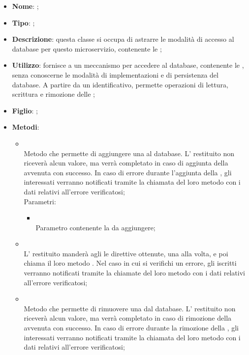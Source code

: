 \begin{itemize}
	\item \textbf{Nome}: ;
	\item \textbf{Tipo}: ;
	\item \textbf{Descrizione}: questa classe si occupa di astrarre le modalità di accesso al database per questo microservizio, contenente le ;
	\item \textbf{Utilizzo}: fornisce a  un meccanismo per accedere al database, contenente le , senza conoscerne le modalità di implementazioni e di persistenza del database. A partire da un identificativo, permette operazioni di lettura, scrittura e rimozione delle ;
	\item \textbf{Figlio}: ;
	\item \textbf{Metodi}:
	\begin{itemize}
		\item[]  \\		Metodo che permette di aggiungere una  al database. L' restituito non riceverà alcun valore, ma verrà completato in caso di aggiunta della  avvenuta con successo. In caso di errore durante l'aggiunta della , gli  interessati verranno notificati tramite la chiamata del loro metodo  con i dati relativi all'errore verificatosi;\\
		Parametri:
		\begin{itemize}
			\item {} \\
			Parametro contenente la  da aggiungere;
		\end{itemize}
		\item[]  \\		L' restituito manderà agli  le direttive ottenute, una alla volta, e poi chiama il loro metodo . Nel caso in cui si verifichi un errore, gli  iscritti verranno notificati tramite la chiamate del loro metodo  con i dati relativi all'errore verificatosi;\\
		\item[]  \\		Metodo che permette di rimuovere una  dal database. L' restituito non riceverà alcun valore, ma verrà completato in caso di rimozione della  avvenuta con successo. In caso di errore durante la rimozione della , gli  interessati verranno notificati tramite la chiamata del loro metodo  con i dati relativi all'errore verificatosi;\\

\end{itemize}
\end{itemize}
